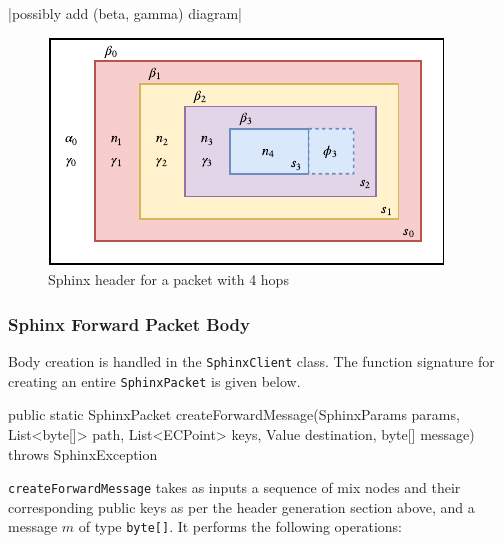 \documentclass[final,dissertation.tex]{subfiles}
\begin{document}
|possibly add (beta, gamma) diagram|


\begin{figure}[h]
	\includegraphics[width=\linewidth]{../figs/sphinx_header}
	\caption{Sphinx header for a packet with 4 hops}\label{fig:sphinx_header}
\end{figure}

\subsubsection{Sphinx Forward Packet Body}

Body creation is handled in the \verb|SphinxClient| class.  The function signature for creating an entire \verb|SphinxPacket| is given below.

\begin{javacode}
public static SphinxPacket createForwardMessage(SphinxParams params,
	List<byte[]> path,
	List<ECPoint> keys,
	Value destination,
	byte[] message) throws SphinxException
\end{javacode}

\verb|createForwardMessage| takes as inputs a sequence of mix nodes and their corresponding public keys as per the header generation section above, and a message $m$ of type \verb|byte[]|. It performs the following operations:
\end{document}
